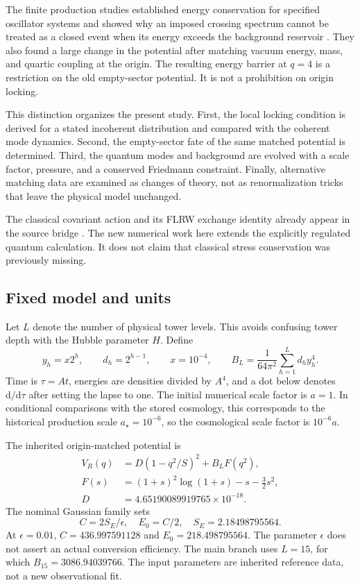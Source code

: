 \documentclass[11pt]{article}
\theoremstyle{definition}\newtheorem{definition}[theorem]{Definition}
\newcommand{\dd}{\mathrm d}\newcommand{\Tr}{\mathcal T}\newcommand{\Ezero}{E_0}
\begin{document}
The finite production studies established energy conservation for specified oscillator systems and showed why an imposed crossing spectrum cannot be treated as a closed event when its energy exceeds the background reservoir \cite{energy,matched}. They also found a large change in the potential after matching vacuum energy, mass, and quartic coupling at the origin. The resulting energy barrier at $q=4$ is a restriction on the old empty-sector potential. It is not a prohibition on origin locking.

This distinction organizes the present study. First, the local locking condition is derived for a stated incoherent distribution and compared with the coherent mode dynamics. Second, the empty-sector fate of the same matched potential is determined. Third, the quantum modes and background are evolved with a scale factor, pressure, and a conserved Friedmann constraint. Finally, alternative matching data are examined as changes of theory, not as renormalization tricks that leave the physical model unchanged.

The classical covariant action and its FLRW exchange identity already appear in the source bridge \cite[Sections 2.4--2.7]{bridge}. The new numerical work here extends the explicitly regulated quantum calculation. It does not claim that classical stress conservation was previously missing.

\subsection{Fixed model and units}
Let $L$ denote the number of physical tower levels. This avoids confusing tower depth with the Hubble parameter $H$. Define
\begin{equation}
y_h=x2^h,\qquad d_h=2^{h-1},\qquad x=10^{-4},\qquad
B_L=\frac{1}{64\pi^2}\sum_{h=1}^{L}d_hy_h^4.
\end{equation}
Time is $\tau=At$, energies are densities divided by $A^4$, and a dot below denotes $\dd/\dd\tau$ after setting the lapse to one. The initial numerical scale factor is $a=1$. In conditional comparisons with the stored cosmology, this corresponds to the historical production scale $a_\star=10^{-6}$, so the cosmological scale factor is $10^{-6}a$.

The inherited origin-matched potential is
\begin{align}
V_R(q)&=D(1-q^2/S)^2+B_LF(q^2),\label{eq:Vorigin}\\
F(s)&=(1+s)^2\log(1+s)-s-\tfrac32s^2,\label{eq:F}\\
D&=4.65190089919765\times10^{-18}.
\end{align}
The nominal Gaussian family sets
\begin{equation}
C=2S_E/\epsilon,\quad \Ezero=C/2,\quad S_E=2.18498795564.
\end{equation}
At $\epsilon=0.01$, $C=436.997591128$ and $\Ezero=218.498795564$. The parameter $\epsilon$ does not assert an actual conversion efficiency. The main branch uses $L=15$, for which $B_{15}=3086.94039766$. The input parameters are inherited reference data, not a new observational fit.
\end{document}
